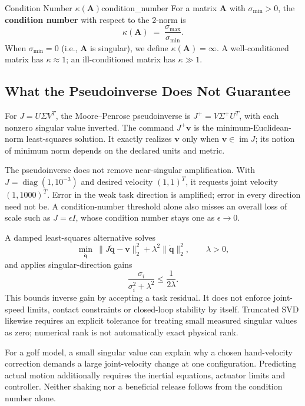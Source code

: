 \begin{definition}{\texorpdfstring{Condition Number $\kappa(\mathbf{A})$}{Condition Number}}{condition_number}
For a matrix $\mathbf{A}$ with $\sigma_{\min}>0$, the
\textbf{condition number} with respect to the 2-norm is
\begin{equation}
  \label{eq:condition_number}
  \kappa(\mathbf{A})
  \;=\; \frac{\sigma_{\max}}{\sigma_{\min}}.
\end{equation}
When $\sigma_{\min}=0$ (i.e., $\mathbf{A}$ is singular), we define
$\kappa(\mathbf{A})=\infty$.
A well-conditioned matrix has $\kappa\approx 1$; an ill-conditioned
matrix has $\kappa\gg 1$.
\end{definition}

\subsection{What the Pseudoinverse Does Not Guarantee}

For $J=U\Sigma V^T$, the Moore--Penrose pseudoinverse is $J^+=V\Sigma^+U^T$, with each nonzero singular value inverted. The command $J^+\mathbf v$ is the minimum-Euclidean-norm least-squares solution. It exactly realizes $\mathbf v$ only when $\mathbf v\in\operatorname{im}J$; its notion of minimum norm depends on the declared units and metric.

The pseudoinverse does not remove near-singular amplification. With $J=\operatorname{diag}(1,10^{-3})$ and desired velocity $(1,1)^T$, it requests joint velocity $(1,1000)^T$. Error in the weak task direction is amplified; error in every direction need not be. A condition-number threshold alone also misses an overall loss of scale such as $J=\epsilon I$, whose condition number stays one as $\epsilon\to0$.

A damped least-squares alternative solves
\[
\min_{\dot{\mathbf q}}\ \|J\dot{\mathbf q}-\mathbf v\|_2^2
+\lambda^2\|\dot{\mathbf q}\|_2^2,\qquad \lambda>0,
\]
and applies singular-direction gains
\[
\frac{\sigma_i}{\sigma_i^2+\lambda^2}
\le\frac{1}{2\lambda}.
\]
This bounds inverse gain by accepting a task residual. It does not enforce joint-speed limits, contact constraints or closed-loop stability by itself. Truncated SVD likewise requires an explicit tolerance for treating small measured singular values as zero; numerical rank is not automatically exact physical rank.

For a golf model, a small singular value can explain why a chosen hand-velocity correction demands a large joint-velocity change at one configuration. Predicting actual motion additionally requires the inertial equations, actuator limits and controller. Neither shaking nor a beneficial release follows from the condition number alone.

